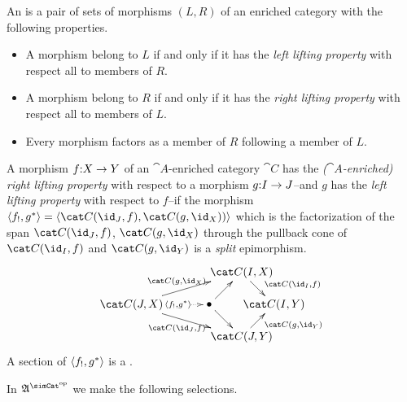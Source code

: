 \documentclass[csh.tex]{subfiles}
\begin{document}
\begin{definition}
An  is a pair of sets of morphisms 
$(L,R)$ of an enriched category with the following properties.
\begin{itemize}
\item A morphism belong to $L$ if and only if it has the 
\emph{left lifting property} with respect all to members of $R$.
\item A morphism belong to $R$ if and only if it has the 
\emph{right lifting property} with respect all to members of $L$.
\item Every morphism factors as a member of $R$ following a member of $L$.
\end{itemize}

A morphism $f\mathord : X\to Y$ of an $\cat A$-enriched category $\cat C$ has the 
\emph{($\cat A$-enriched) right lifting property} with respect to a morphism
 $g\mathord : I\to J$--and $g$ has the \emph{left lifting property} with respect to 
 $f$--if the morphism $\tuplet{f_!,g\ri} = \tuplet{\cat C(\id_J,f),\cat C(g,\id_X))}$ 
 which is the factorization of the span $\cat C(\id_J,f)$, $\cat C(g,\id_X)$ 
 through the pullback cone of $\cat C(\id_I,f)$ and $\cat C(g,\id_Y)$ is a 
 \emph{split} epimorphism.
\[\xy
(34,20)*+{\cat C(I,X)}="top",(0,10)*+{\cat C(J,X)}="left",(24,10)*+{\bullet}="middle",(44,10)*+{\cat C(I,Y)}="right",(34,0)*+{\cat C(J,Y)}="bottom"
\ar^{\cat C(g,\id_X)} "left";"top" \ar@{.>}|(.6){\tuplet{f_!,g\ri}} "left";"middle" \ar_{\cat C(\id_J,f)} "left";"bottom" \ar "middle";"bottom"
\ar "middle";"top" \ar^(.6){\cat C(\id_I,f)} "top";"right" \ar_(.6){\cat C(g,\id_Y)} "bottom";"right"
\endxy\]
A section of $\left\langle f_!,g^* \right\rangle$ is a .
\end{definition}

In $\ambient\s$ we make the following selections. 
\end{document}
